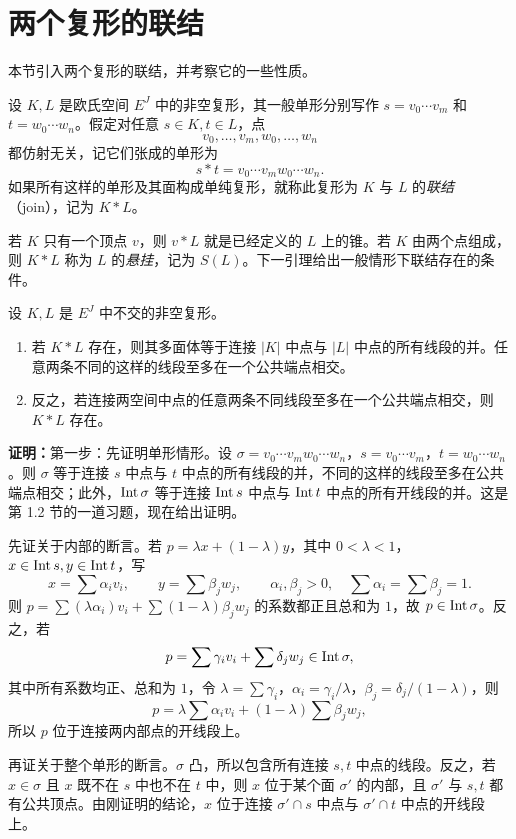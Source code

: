 \section{两个复形的联结}
本节引入两个复形的联结，并考察它的一些性质。

设 $K,L$ 是欧氏空间 $E^J$ 中的非空复形，其一般单形分别写作 $s=v_0\cdots v_m$ 和 $t=w_0\cdots w_n$。假定对任意 $s\in K,t\in L$，点
\[v_0,\ldots,v_m,w_0,\ldots,w_n\]
都仿射无关，记它们张成的单形为
\[s*t=v_0\cdots v_mw_0\cdots w_n.\]
如果所有这样的单形及其面构成单纯复形，就称此复形为 $K$ 与 $L$ 的\emph{联结}（join），记为 $K*L$。

若 $K$ 只有一个顶点 $v$，则 $v*L$ 就是已经定义的 $L$ 上的锥。若 $K$ 由两个点组成，则 $K*L$ 称为 $L$ 的\emph{悬挂}，记为 $S(L)$。下一引理给出一般情形下联结存在的条件。

设 $K,L$ 是 $E^J$ 中不交的非空复形。
\begin{enumerate}[label=(\alph*)]
\item 若 $K*L$ 存在，则其多面体等于连接 $|K|$ 中点与 $|L|$ 中点的所有线段的并。任意两条不同的这样的线段至多在一个公共端点相交。
\item 反之，若连接两空间中点的任意两条不同线段至多在一个公共端点相交，则 $K*L$ 存在。
\end{enumerate}

\textbf{证明：}第一步：先证明单形情形。设 $\sigma=v_0\cdots v_mw_0\cdots w_n$，$s=v_0\cdots v_m$，$t=w_0\cdots w_n$。则 $\sigma$ 等于连接 $s$ 中点与 $t$ 中点的所有线段的并，不同的这样的线段至多在公共端点相交；此外，$\operatorname{Int}\sigma$ 等于连接 $\operatorname{Int} s$ 中点与 $\operatorname{Int} t$ 中点的所有开线段的并。这是第 1.2 节的一道习题，现在给出证明。

先证关于内部的断言。若 $p=\lambda x+(1-\lambda)y$，其中 $0<\lambda<1$，$x\in\operatorname{Int} s,y\in\operatorname{Int} t$，写
\[x=\sum\alpha_i v_i,\qquad y=\sum\beta_jw_j,\qquad
\alpha_i,\beta_j>0,\quad\sum\alpha_i=\sum\beta_j=1.\]
则 $p=\sum(\lambda\alpha_i)v_i+\sum(1-\lambda)\beta_jw_j$ 的系数都正且总和为 $1$，故 $p\in\operatorname{Int}\sigma$。反之，若
\[p=\sum\gamma_iv_i+\sum\delta_jw_j\in\operatorname{Int}\sigma,\]
其中所有系数均正、总和为 $1$，令 $\lambda=\sum\gamma_i$，$\alpha_i=\gamma_i/\lambda$，$\beta_j=\delta_j/(1-\lambda)$，则
\[p=\lambda\sum\alpha_iv_i+(1-\lambda)\sum\beta_jw_j,\]
所以 $p$ 位于连接两内部点的开线段上。

再证关于整个单形的断言。$\sigma$ 凸，所以包含所有连接 $s,t$ 中点的线段。反之，若 $x\in\sigma$ 且 $x$ 既不在 $s$ 中也不在 $t$ 中，则 $x$ 位于某个面 $\sigma'$ 的内部，且 $\sigma'$ 与 $s,t$ 都有公共顶点。由刚证明的结论，$x$ 位于连接 $\sigma'\cap s$ 中点与 $\sigma'\cap t$ 中点的开线段上。

